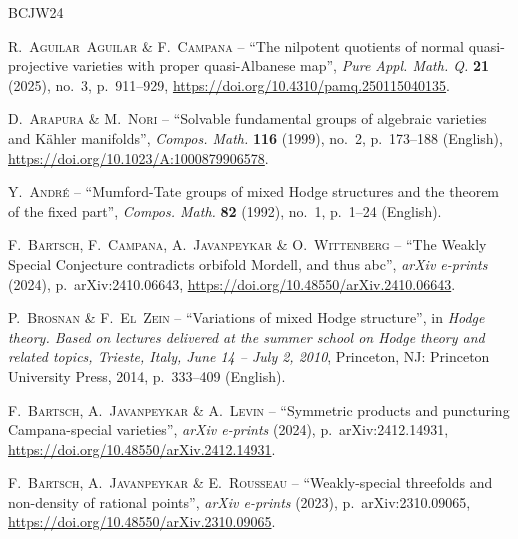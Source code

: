 \documentclass[11pt,english]{smfart}
\theoremstyle{plain}
\theoremstyle{definition}
\theoremstyle{remark}
\numberwithin{equation}{subsection}
\theoremstyle{plain}
\begin{document}
 \providecommand{\bysame}{\leavevmode ---\ }
 \providecommand{\og}{``}
 \providecommand{\fg}{''}
 \providecommand{\smfandname}{\&}
 \providecommand{\smfedsname}{\'eds.}
 \providecommand{\smfedname}{\'ed.}
 \providecommand{\smfmastersthesisname}{M\'emoire}
 \providecommand{\smfphdthesisname}{Th\`ese}
 \begin{thebibliography}{BCJW24}
 	
 	{\scshape R.~Aguilar~Aguilar {\normalfont \smfandname} F.~Campana} -- {\og The
 		nilpotent quotients of normal quasi-projective varieties with proper
 		quasi-{A}lbanese map\fg}, \emph{Pure Appl. Math. Q.} \textbf{21} (2025),
 	no.~3, p.~911--929, \url{https://doi.org/10.4310/pamq.250115040135}.
 	
 	{\scshape D.~Arapura {\normalfont \smfandname} M.~Nori} -- {\og Solvable
 		fundamental groups of algebraic varieties and {K{\"a}hler} manifolds\fg},
 	\emph{Compos. Math.} \textbf{116} (1999), no.~2, p.~173--188 (English),
 	\url{https://doi.org/10.1023/A:1000879906578}.
 	
 	{\scshape Y.~Andr{\'e}} -- {\og Mumford-{Tate} groups of mixed {Hodge}
 		structures and the theorem of the fixed part\fg}, \emph{Compos. Math.}
 	\textbf{82} (1992), no.~1, p.~1--24 (English).
 	
 	{\scshape F.~{Bartsch}, F.~{Campana}, A.~{Javanpeykar} {\normalfont
 			\smfandname} O.~{Wittenberg}} -- {\og {The Weakly Special Conjecture
 			contradicts orbifold Mordell, and thus abc}\fg}, \emph{arXiv e-prints}
 	(2024), p.~arXiv:2410.06643, \url{https://doi.org/10.48550/arXiv.2410.06643}.
 	
 	{\scshape P.~Brosnan {\normalfont \smfandname} F.~El~Zein} -- {\og Variations
 		of mixed {Hodge} structure\fg}, in \emph{Hodge theory. Based on lectures
 		delivered at the summer school on Hodge theory and related topics, Trieste,
 		Italy, June 14 -- July 2, 2010}, Princeton, NJ: Princeton University Press,
 	2014, p.~333--409 (English).
 	
 	{\scshape F.~{Bartsch}, A.~{Javanpeykar} {\normalfont \smfandname} A.~{Levin}}
 	-- {\og {Symmetric products and puncturing Campana-special varieties}\fg},
 	\emph{arXiv e-prints} (2024), p.~arXiv:2412.14931,
 	\url{https://doi.org/10.48550/arXiv.2412.14931}.
 	
 	{\scshape F.~{Bartsch}, A.~{Javanpeykar} {\normalfont \smfandname}
 		E.~{Rousseau}} -- {\og {Weakly-special threefolds and non-density of rational
 			points}\fg}, \emph{arXiv e-prints} (2023), p.~arXiv:2310.09065,
 	\url{https://doi.org/10.48550/arXiv.2310.09065}.
 	

\end{thebibliography}
\end{document}

